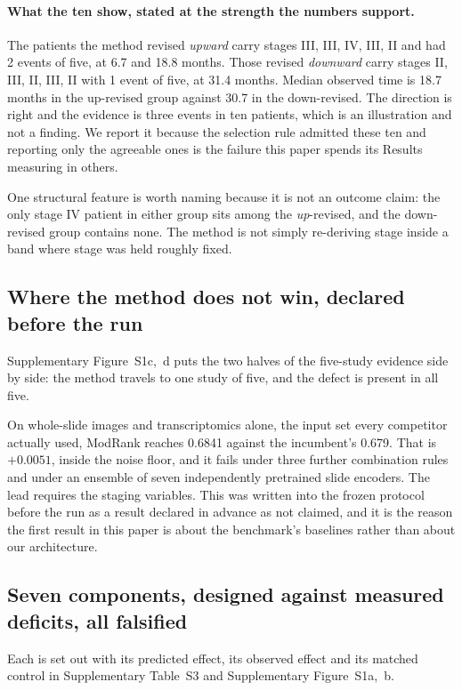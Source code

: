 \documentclass[unnumsec,webpdf,contemporary,large]{oup-authoring-template}
\begin{document}
\paragraph{What the ten show, stated at the strength the numbers support.} The patients the method
revised \emph{upward} carry stages III, III, IV, III, II and had 2 events of five, at 6.7 and 18.8 months. Those revised
\emph{downward} carry stages II, III, II, III, II with 1 event of five, at 31.4 months. Median observed time is
18.7 months in the up-revised group against 30.7 in the down-revised. The direction is
right and the evidence is three events in ten patients, which is an illustration and not a
finding. We report it because the selection rule admitted these ten and reporting only the
agreeable ones is the failure this paper spends its Results measuring in others.

One structural feature is worth naming because it is not an outcome claim: the only stage IV patient
in either group sits among the \emph{up}-revised, and the down-revised group contains none. The
method is not simply re-deriving stage inside a band where stage was held roughly fixed.


\subsection{Where the method does not win, declared before the run}

Supplementary Figure~S1c,~d puts the two halves of the five-study evidence side by side: the method
travels to one study of five, and the defect is present in all five.

On whole-slide images and transcriptomics alone, the input set every competitor actually used, ModRank reaches 0.6841 against the incumbent's 0.679. That is $+0.0051$, inside the
noise floor, and it fails under three further combination rules and under an ensemble of seven
independently pretrained slide encoders. The lead requires the staging variables. This was
written into the frozen protocol before the run as a result declared in advance as not claimed,
and it is the reason the first result in this paper is about the benchmark's baselines rather than
about our architecture.

\subsection{Seven components, designed against measured deficits, all falsified}

Each is set out with its predicted effect, its observed effect and its matched control in
Supplementary Table~S3 and Supplementary Figure~S1a,~b.
\end{document}
